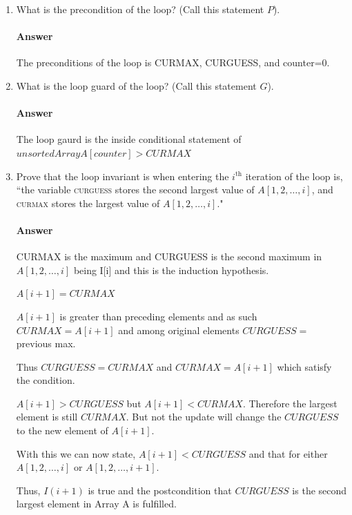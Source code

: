 \documentclass{article}
\begin{document}
\begin{enumerate}
    \item What is the precondition of the loop? (Call this statement $P$).

        \paragraph{Answer}

        The preconditions of the loop is CURMAX, CURGUESS, and counter=0.

    \item What is the loop guard of the loop? (Call this statement $G$).

        \paragraph{Answer}

        The loop gaurd is the inside conditional statement of $unsortedArrayA[counter] > CURMAX$

    \item Prove that the loop invariant is when entering the $i^\text{th}$
        iteration of the loop is, ``the variable \textsc{curguess} stores
        the second
        largest value of $A[1,2, \ldots, i]$,
        and \textsc{curmax} stores the largest value of $A[1,2,\ldots, i]$."

        \paragraph{Answer}

        CURMAX is the maximum and CURGUESS is the second maximum in $A[1,2,\ldots, i]$
        being I[i] and this is the induction hypothesis.

        $A[i+1] = CURMAX$

        $A[i+1]$ is greater than preceding elements and as such $CURMAX = A[i+1]$
        and among original elements $CURGUESS =$ previous max.

        Thus $CURGUESS = CURMAX$ and $CURMAX = A[i+1]$ which satisfy the condition.

        $A[i+1] > CURGUESS$ but $A[i+1] < CURMAX$.
        Therefore the largest element is still $CURMAX$. But not the update will
        change the $CURGUESS$ to the new element of $A[i+1]$.

        With this we can now state, $A[i+1] < CURGUESS$ and that for either $A[1,2,\ldots, i]$
        or $A[1,2,\ldots, i+1]$.

        Thus, $I(i+1)$ is true and the postcondition that $CURGUESS$ is the second largest
        element in Array A is fulfilled.


\end{enumerate}
\end{document}
